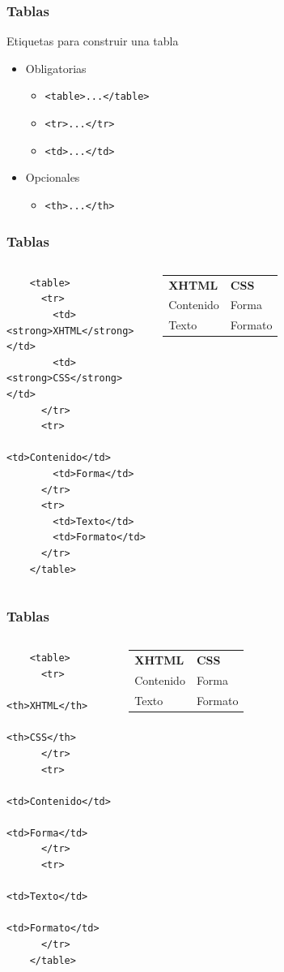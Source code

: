 \documentclass{beamer}
\begin{document}
\begin{frame}[fragile]
\frametitle{Tablas}
	Etiquetas para construir una tabla
	\begin{itemize}
	\item Obligatorias
		\begin{itemize}
		\item \verb|<table>...</table>|
		\item \verb|<tr>...</tr>|
		\item \verb|<td>...</td>|
		\end{itemize}
	\pause
	\item Opcionales
		\begin{itemize}
		\item \verb|<th>...</th>|
		\end{itemize}
	\end{itemize}
\end{frame}

\begin{frame}[fragile]
\frametitle{Tablas}
	\begin{columns}[c]
	\small{
	\begin{verbatim}
	<table>
	  <tr>
	    <td><strong>XHTML</strong></td>
	    <td><strong>CSS</strong></td>
	  </tr>
	  <tr>
	    <td>Contenido</td>
	    <td>Forma</td>
	  </tr>
	  <tr>
	    <td>Texto</td>
	    <td>Formato</td>
	  </tr>
	</table>
	\end{verbatim}
	}
	\begin{tabular}{ll}
	\textbf{XHTML} & \textbf{CSS} \\ 
	Contenido & Forma \\ 
	Texto & Formato \\ 
	\end{tabular} 
	\end{columns}
\end{frame}

\begin{frame}[fragile]
\frametitle{Tablas}
	\begin{columns}[c]
	\small{
	\begin{verbatim}
	<table>
	  <tr>
	    <th>XHTML</th>
	    <th>CSS</th>
	  </tr>
	  <tr>
	    <td>Contenido</td>
	    <td>Forma</td>
	  </tr>
	  <tr>
	    <td>Texto</td>
	    <td>Formato</td>
	  </tr>
	</table>
	\end{verbatim}
	}
	\begin{tabular}{ll}
	\textbf{XHTML} & \textbf{CSS} \\ 
	Contenido & Forma \\ 
	Texto & Formato \\ 
	\end{tabular} 
	\end{columns}
\end{frame}
\end{document}
